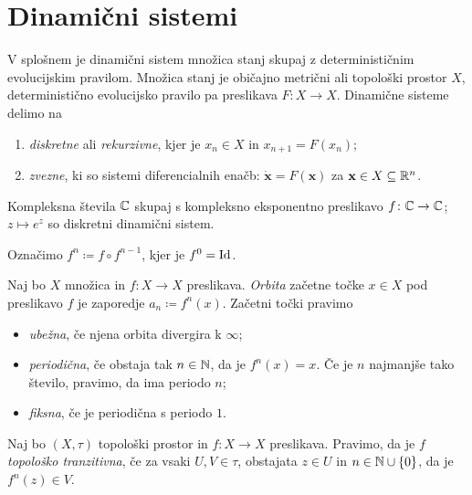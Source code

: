 \section{Dinamični sistemi} \label{sec:dis}

V splošnem je dinamični sistem množica stanj skupaj z determinističnim evolucijskim pravilom. Množica stanj je običajno metrični ali topološki prostor \(X\), deterministično evolucijsko pravilo pa preslikava \(F \colon X \to X\). Dinamične sisteme delimo na

\begin{enumerate}
    \item \emph{diskretne} ali \emph{rekurzivne}, kjer je \(x_n \in X\) in
        \(x_{n + 1} = F (x_n)\);
    \item \emph{zvezne}, ki so sistemi diferencialnih enačb:
        \(\dot{\mathbf{x}} = F (\mathbf{x})\) za
        \(\mathbf{x} \in X \subseteq \mathbb R^n\).
\end{enumerate}

\begin{zgled}
    Kompleksna števila \(\mathbb C\) skupaj s kompleksno eksponentno preslikavo \(f \colon \mathbb C \to \mathbb C\); \(z \mapsto e^{z}\) so diskretni dinamični sistem.
\end{zgled}

\noindent Označimo \(f^n \coloneq f \circ f^{n - 1}\), kjer je
\(f^0 = \operatorname{Id}\).

\begin{definicija}
    Naj bo \(X\) množica in \(f \colon X \to X\) preslikava. \emph{Orbita} začetne točke \(x \in X\) pod preslikavo \(f\) je zaporedje \(a_n \coloneq f^n (x)\). Začetni točki pravimo
    \begin{itemize}
        \item \emph{ubežna}, če njena orbita divergira k \(\infty\);
        \item \emph{periodična}, če obstaja tak \(n \in \mathbb N\), da je \(f^n (x) = x\). Če je \(n\) najmanjše tako število, pravimo, da ima periodo \(n\);
        \item \emph{fiksna}, če je periodična s periodo \(\num{1}\).
    \end{itemize}
\end{definicija}

\begin{definicija}
    Naj bo \((X, \tau)\) topološki prostor in \(f \colon X \to X\) preslikava. Pravimo, da je \(f\) \emph{topološko tranzitivna}, če za vsaki \(U, V \in \tau\), obstajata \(z \in U\) in
    \(n \in \mathbb N \cup \left\{ 0 \right\}\), da je \(f^n (z) \in V\).
\end{definicija}

